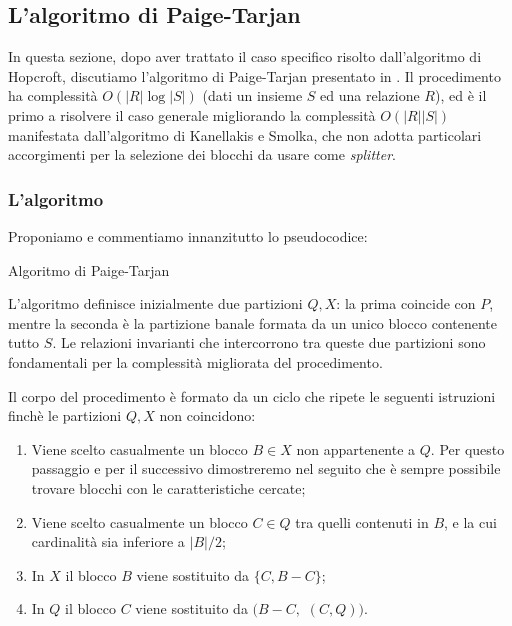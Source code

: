 \subsection{L'algoritmo di Paige-Tarjan}
In questa sezione, dopo aver trattato il caso specifico risolto dall'algoritmo di Hopcroft, discutiamo l'algoritmo di Paige-Tarjan presentato in \cite{paigetarjan}. Il procedimento ha complessità $O(|R|\log |S|)$ (dati un insieme $S$ ed una relazione $R$), ed è il primo a risolvere il caso generale migliorando la complessità $O(|R||S|)$ manifestata dall'algoritmo di Kanellakis e Smolka, che non adotta particolari accorgimenti per la selezione dei blocchi da usare come \emph{splitter}.

\subsubsection{L'algoritmo}
Proponiamo e commentiamo innanzitutto lo pseudocodice:\\
\begin{algorithm}[H]
    \label{alg:pt}
    \caption{Algoritmo di Paige-Tarjan}
\end{algorithm}

L'algoritmo definisce inizialmente due partizioni $Q,X$: la prima coincide con $P$, mentre la seconda è la partizione banale formata da un unico blocco contenente tutto $S$. Le relazioni invarianti che intercorrono tra queste due partizioni sono fondamentali per la complessità migliorata del procedimento.

Il corpo del procedimento è formato da un ciclo che ripete le seguenti istruzioni finchè le partizioni $Q,X$ non coincidono:
\begin{enumerate}
    \item Viene scelto casualmente un blocco $B \in X$ non appartenente a $Q$. Per questo passaggio e per il successivo dimostreremo nel seguito che è sempre possibile trovare blocchi con le caratteristiche cercate;
    \item Viene scelto casualmente un blocco $C \in Q$ tra quelli contenuti in $B$, e la cui cardinalità sia inferiore a $|B|/2$;
    \item In $X$ il blocco $B$ viene sostituito da $\{C, B-C\}$;
    \item In $Q$ il blocco $C$ viene sostituito da \splitfunc$(B-C,$ \splitfunc$(C,Q))$.
\end{enumerate}

